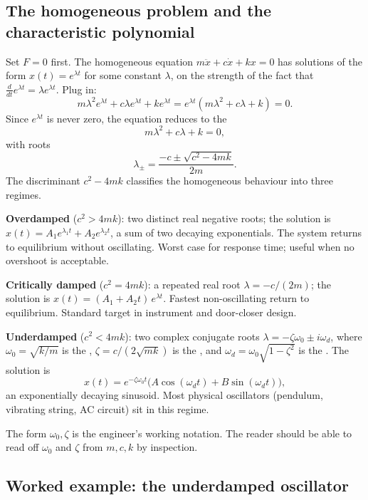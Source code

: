 \subsection{The homogeneous problem and the characteristic polynomial}

Set $F = 0$ first. The homogeneous equation
$m \ddot{x} + c \dot{x} + k x = 0$ has solutions of the form $x(t) =
e^{\lambda t}$ for some constant $\lambda$, on the strength of the
fact that $\frac{d}{dt}e^{\lambda t} = \lambda e^{\lambda t}$. Plug
in:
\[
m \lambda^{2} e^{\lambda t} + c \lambda e^{\lambda t} + k e^{\lambda t} = e^{\lambda t}(m \lambda^{2} + c \lambda + k) = 0.
\]
Since $e^{\lambda t}$ is never zero, the equation reduces to the
\[
m \lambda^{2} + c \lambda + k = 0,
\]
with roots
\[
\lambda_{\pm} = \frac{-c \pm \sqrt{c^{2} - 4 m k}}{2 m}.
\]
The discriminant $c^{2} - 4 m k$ classifies the homogeneous
behaviour into three regimes.

\textbf{Overdamped} ($c^{2} > 4 m k$): two distinct real negative
roots; the solution is $x(t) = A_{1} e^{\lambda_{1} t} + A_{2}
e^{\lambda_{2} t}$, a sum of two decaying exponentials. The system
returns to equilibrium without oscillating. Worst case for response
time; useful when no overshoot is acceptable.

\textbf{Critically damped} ($c^{2} = 4 m k$): a repeated real root
$\lambda = -c/(2 m)$; the solution is $x(t) = (A_{1} + A_{2} t)\,
e^{\lambda t}$. Fastest non-oscillating return to equilibrium.
Standard target in instrument and door-closer design.

\textbf{Underdamped} ($c^{2} < 4 m k$): two complex conjugate roots
$\lambda = -\zeta \omega_{0} \pm i \omega_{d}$, where
$\omega_{0} = \sqrt{k/m}$ is the , $\zeta
= c / (2 \sqrt{m k})$ is the , and
$\omega_{d} = \omega_{0}\sqrt{1 - \zeta^{2}}$ is the
. The solution is
\[
x(t) = e^{-\zeta \omega_{0} t} \bigl(A \cos(\omega_{d} t) + B \sin(\omega_{d} t)\bigr),
\]
an exponentially decaying sinusoid. Most physical oscillators
(pendulum, vibrating string, AC circuit) sit in this regime.

The form $\omega_{0}, \zeta$ is the engineer's working notation.
The reader should be able to read off $\omega_{0}$ and $\zeta$ from
$m, c, k$ by inspection.

\subsection{Worked example: the underdamped oscillator}

